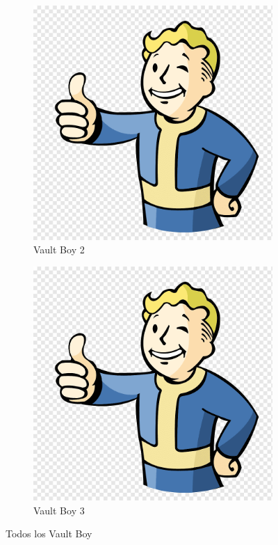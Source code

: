 \documentclass[%
    school=etsisi,%
    type=pfg,%
    degree=61CI,%
]{upm-report}
\begin{document}
\begin{figure}
\begin{subfigure}{.3\textwidth}
		\includegraphics[width=\textwidth]{figures/vault-boy.png}
		\caption{Vault Boy 2}
	\end{subfigure}
    \hfill
	\begin{subfigure}{.3\textwidth}
		\includegraphics[width=\textwidth]{figures/vault-boy.png}
		\caption{Vault Boy 3}
	\end{subfigure}
	\caption{\label{fig:subfigures}Todos los Vault Boy}
\end{figure}
\end{document}
